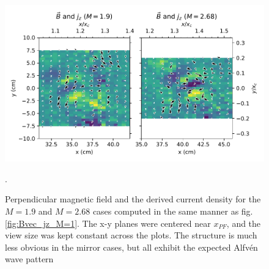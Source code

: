 \begin{figure}
    \centering
    \includegraphics[width=450pt]{figures/Bvec_Jz_M=1-9+2-68.pdf}
    \caption[$B_\perp$ and the derived current density for the $M=1.9$ and $M=2.68$ cases]{Perpendicular magnetic field and the derived current density for the $M=1.9$ and $M=2.68$ cases computed in the same manner as fig. \ref{fig:Bvec_jz_M=1}. The x-y planes were centered near $x_{PF}$, and the view size was kept constant across the plots. The structure is much less obvious in the mirror cases, but all exhibit the expected Alfv\'en wave pattern}. 
    \label{fig:Bvec_jz_M=1-9+2-68}
\end{figure}

